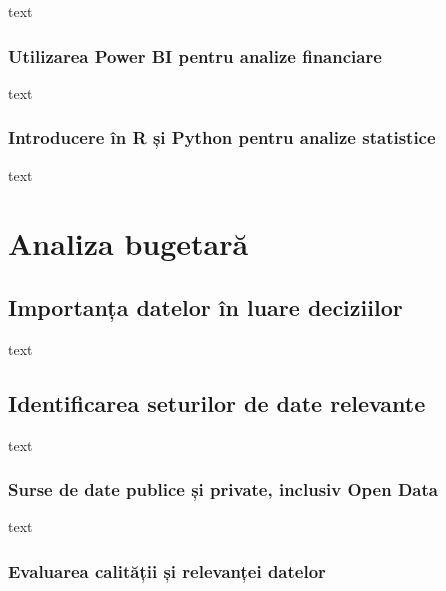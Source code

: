 \documentclass[
  11pt,
  b5paper,
  nottoc]{book}
\begin{document}
text

\hypertarget{utilizarea-power-bi-pentru-analize-financiare-2}{%
\subsection{Utilizarea Power BI pentru analize
financiare}\label{utilizarea-power-bi-pentru-analize-financiare-2}}

text

\hypertarget{introducere-uxeen-r-ux219i-python-pentru-analize-statistice-2}{%
\subsection{Introducere în R și Python pentru analize
statistice}\label{introducere-uxeen-r-ux219i-python-pentru-analize-statistice-2}}

text


\hypertarget{cap4}{%
\chapter{Analiza bugetară}\label{cap4}}

\hypertarget{importanux21ba-datelor-uxeen-luare-deciziilor-3}{%
\section{Importanța datelor în luare
deciziilor}\label{importanux21ba-datelor-uxeen-luare-deciziilor-3}}

text

\hypertarget{identificarea-seturilor-de-date-relevante-3}{%
\section{Identificarea seturilor de date
relevante}\label{identificarea-seturilor-de-date-relevante-3}}

text

\hypertarget{surse-de-date-publice-ux219i-private-inclusiv-open-data-3}{%
\subsection{Surse de date publice și private, inclusiv Open
Data}\label{surse-de-date-publice-ux219i-private-inclusiv-open-data-3}}

text

\hypertarget{evaluarea-calitux103ux21bii-ux219i-relevanux21bei-datelor-3}{%
\subsection{Evaluarea calității și relevanței
datelor}\label{evaluarea-calitux103ux21bii-ux219i-relevanux21bei-datelor-3}}
\end{document}
